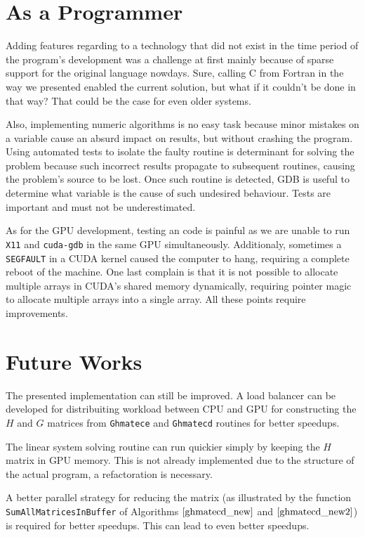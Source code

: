 \section{As a Programmer}

Adding features regarding to a technology that did not exist in the time period of the program's 
development was a challenge at first mainly because of sparse support for the original language nowdays. 
Sure, calling C from Fortran in the way we presented enabled the current solution, 
but what if it couldn't be done in that way? That could be the case for even older systems.

Also, implementing numeric algorithms is no easy task because minor mistakes on a variable cause an 
absurd impact on results, but without crashing the program. Using automated tests to isolate the 
faulty routine is determinant for solving the problem because such incorrect results propagate to 
subsequent routines, causing the problem's source to be lost. Once such routine is detected, GDB 
is useful to determine what variable is the cause of such undesired behaviour. Tests are important 
and must not be underestimated.

As for the GPU development, testing an code is painful as we are unable to run \texttt{X11} and \texttt{cuda-gdb} 
in the same GPU  simultaneously. Additionaly, sometimes a \texttt{SEGFAULT} in a CUDA kernel caused the computer 
to hang, requiring a complete reboot of the machine. 
One last complain is that it is not possible to allocate multiple arrays in CUDA's shared memory dynamically, 
requiring pointer magic to allocate multiple arrays into a single array. All these points require improvements. 

\section{Future Works}

The presented implementation can still be improved. A load balancer can be developed for 
distribuiting workload between CPU and GPU for constructing the $H$ and $G$ matrices from 
\texttt{Ghmatece} and \texttt{Ghmatecd} routines for better speedups.  

The linear system solving routine can run quickier simply by keeping the $H$ 
matrix in GPU memory. This is not already implemented due to the structure of the actual 
program, a refactoration is necessary.

A better parallel strategy for reducing the matrix (as illustrated by the function \newline 
\texttt{SumAllMatricesInBuffer} of Algorithms $\ref{ghmatecd_new}$ and $\ref{ghmatecd_new2}$) is 
required for better speedups. This can lead to even better speedups.
